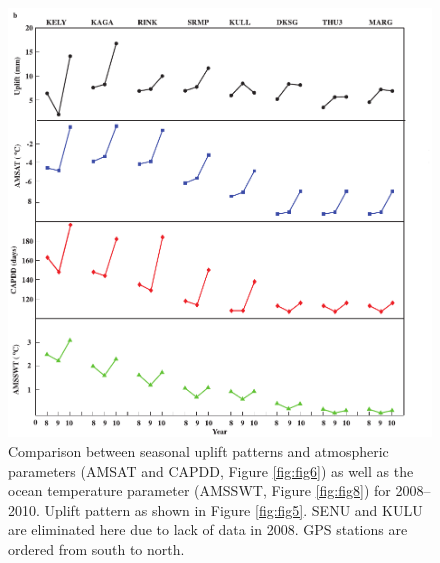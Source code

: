 \begin{figure}
 \centering
 \includegraphics{figs_chpt3/2012GC004432-p12b.pdf} 
 \caption[Comparison between seasonal uplift patterns and atmospheric parameters (AMSAT and CAPDD, Figure \ref{fig:fig6}) as well as the ocean temperature parameter (AMSSWT, Figure \ref{fig:fig8}) for 2008–2010.]{Comparison between seasonal uplift patterns and atmospheric parameters (AMSAT and CAPDD, Figure \ref{fig:fig6}) as well as the ocean temperature parameter (AMSSWT, Figure \ref{fig:fig8}) for 2008–2010. Uplift pattern as shown in Figure \ref{fig:fig5}. SENU and KULU are eliminated here due to lack of data in 2008. GPS stations are ordered from south to north.}
 \label{fig:fig12}
\end{figure}

